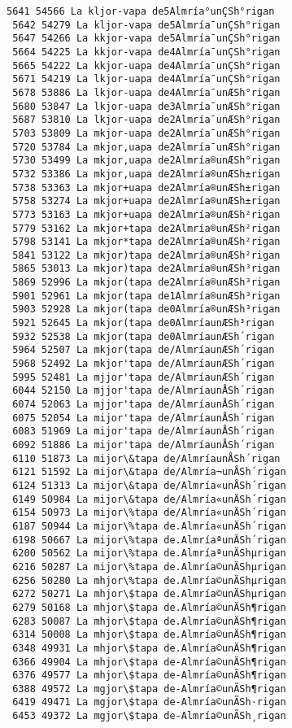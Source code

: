 \documentclass[11pt]{article}
\begin{document}
\begin{Verbatim}[commandchars=\\\{\}]
 5641 54566 La kljor-vapa de5Almría°unÇSh°rigan
 5642 54279 La kljor-vapa de5Almría¯unÇSh°rigan
 5647 54266 La kkjor-vapa de5Almría¯unÇSh°rigan
 5664 54225 La kkjor-vapa de4Almría¯unÇSh°rigan
 5665 54222 La kkjor-uapa de4Almría¯unÇSh°rigan
 5671 54219 La lkjor-uapa de4Almría¯unÇSh°rigan
 5678 53886 La lkjor-uapa de4Almría¯unÆSh°rigan
 5680 53847 La lkjor-uapa de3Almría¯unÆSh°rigan
 5687 53810 La lkjor-uapa de2Almría¯unÆSh°rigan
 5703 53809 La mkjor-uapa de2Almría¯unÆSh°rigan
 5720 53784 La mkjor,uapa de2Almría¯unÆSh°rigan
 5730 53499 La mkjor,uapa de2Almría®unÆSh°rigan
 5732 53386 La mkjor,uapa de2Almría®unÆSh±rigan
 5738 53363 La mkjor+uapa de2Almría®unÆSh±rigan
 5758 53274 La mkjor+uapa de2Almría®unÆSh±rigan
 5773 53163 La mkjor+uapa de2Almría®unÆSh²rigan
 5779 53162 La mkjor+tapa de2Almría®unÆSh²rigan
 5798 53141 La mkjor*tapa de2Almría®unÆSh²rigan
 5841 53122 La mkjor)tapa de2Almría®unÆSh²rigan
 5865 53013 La mkjor)tapa de2Almría®unÆSh³rigan
 5869 52996 La mkjor(tapa de2Almría®unÆSh³rigan
 5901 52961 La mkjor(tapa de1Almría®unÆSh³rigan
 5903 52928 La mkjor(tapa de0Almría®unÆSh³rigan
 5921 52645 La mkjor(tapa de0Almría­unÆSh³rigan
 5932 52538 La mkjor(tapa de0Almría­unÆSh´rigan
 5964 52507 La mkjor(tapa de/Almría­unÆSh´rigan
 5968 52492 La mkjor'tapa de/Almría­unÆSh´rigan
 5995 52481 La mjjor'tapa de/Almría­unÆSh´rigan
 6044 52150 La mjjor'tapa de/Almría­unÅSh´rigan
 6074 52063 La mjjor'tapa de/Almría­unÅSh´rigan
 6075 52054 La mijor'tapa de/Almría­unÅSh´rigan
 6083 51969 La mijor'tapa de/Almría­unÅSh´rigan
 6092 51886 La mijor'tapa de/Almría­unÅSh´rigan
 6110 51873 La mijor\&tapa de/Almría­unÅSh´rigan
 6121 51592 La mijor\&tapa de/Almría¬unÅSh´rigan
 6124 51313 La mijor\&tapa de/Almría«unÅSh´rigan
 6149 50984 La mijor\&tapa de/Almría«unÄSh´rigan
 6154 50973 La mijor\%tapa de/Almría«unÄSh´rigan
 6187 50944 La mijor\%tapa de.Almría«unÄSh´rigan
 6198 50667 La mijor\%tapa de.AlmríaªunÄSh´rigan
 6200 50562 La mijor\%tapa de.AlmríaªunÄShµrigan
 6216 50287 La mijor\%tapa de.Almría©unÄShµrigan
 6256 50280 La mhjor\%tapa de.Almría©unÄShµrigan
 6272 50271 La mhjor\$tapa de.Almría©unÄShµrigan
 6279 50168 La mhjor\$tapa de.Almría©unÄSh¶rigan
 6283 50087 La mhjor\$tapa de.Almría©unÄSh¶rigan
 6314 50008 La mhjor\$tapa de.Almría©unÄSh¶rigan
 6348 49931 La mhjor\$tapa de.Almría©unÄSh¶rigan
 6366 49904 La mhjor\$tapa de-Almría©unÄSh¶rigan
 6376 49577 La mhjor\$tapa de-Almría©unÃSh¶rigan
 6388 49572 La mgjor\$tapa de-Almría©unÃSh¶rigan
 6419 49471 La mgjor\$tapa de-Almría©unÃSh·rigan
 6453 49372 La mgjor\$tapa de-Almría©unÃSh¸rigan

\end{Verbatim}
\end{document}
